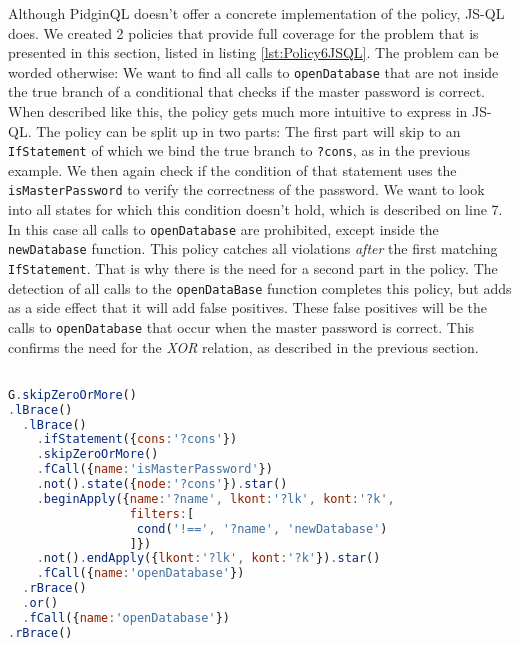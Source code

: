 Although PidginQL doesn't offer a concrete implementation of the policy, JS-QL does. We created 2 policies that provide full coverage for the problem that is presented in this section, listed in listing \ref{lst:Policy6JSQL}. The problem can be worded otherwise: We want to find all calls to \texttt{openDatabase} that are not inside the true branch of a conditional that checks if the master password is correct. When described like this, the policy gets much more intuitive to express in JS-QL. The policy can be split up in two parts: The first part will skip to an \texttt{IfStatement} of which we bind the true branch to \texttt{?cons}, as in the previous example. We then again check if the condition of that statement uses the \texttt{isMasterPassword} to verify the correctness of the password. We want to look into all states for which this condition doesn't hold, which is described on line 7. In this case all calls to \texttt{openDatabase} are prohibited, except inside the \texttt{newDatabase} function. This policy catches all violations \textit{after} the first matching \texttt{IfStatement}. That is why there is the need for a second part in the policy. The detection of all calls to the \texttt{openDataBase} function completes this policy, but adds as a side effect that it will add false positives. These false positives will be the calls to \texttt{openDatabase} that occur when the master password is correct. This confirms the need for the \textit{XOR} relation, as described in the previous section. 

\begin{lstlisting}[label={lst:Policy6JSQL},language=JavaScript,caption=Policy 6 in JS-QL,mathescape=true]  % float=t?

G.skipZeroOrMore()
.lBrace()
  .lBrace()
    .ifStatement({cons:'?cons'})
    .skipZeroOrMore()
    .fCall({name:'isMasterPassword'})
    .not().state({node:'?cons'}).star()
    .beginApply({name:'?name', lkont:'?lk', kont:'?k',
                 filters:[
                  cond('!==', '?name', 'newDatabase')
                 ]})
    .not().endApply({lkont:'?lk', kont:'?k'}).star()
    .fCall({name:'openDatabase'})
  .rBrace()
  .or()
  .fCall({name:'openDatabase'})
.rBrace()
\end{lstlisting}


